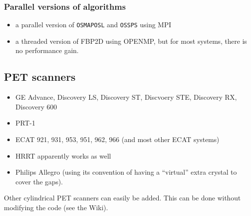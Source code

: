 \documentclass{article}
\begin{document}
\subsubsection{
Parallel versions of algorithms}
\begin{itemize}
\item a parallel version of \texttt{OSMAPOSL} and \texttt{OSSPS} using MPI 
\item a threaded version of FBP2D using OPENMP, but for most systems, there is no performance gain.
\end{itemize}




\subsection{
PET scanners}
\begin{itemize}
\item 
GE Advance, Discovery LS, Discovery ST, Discvoery STE, Discovery RX,
Discovery 600 
\item 
PRT-1 
\item 
ECAT 921, 931, 953, 951, 962, 966 (and most other ECAT systems) 
\item 
HRRT apparently works as well
\item Philips Allegro (using its convention of having a ``virtual'' extra crystal to cover the gaps).
\end{itemize}

Other cylindrical PET scanners can easily be added. This can be done
without modifying the code (see the Wiki).
\end{document}
